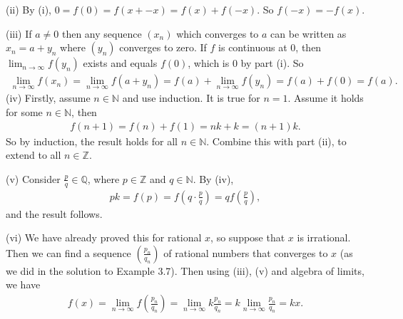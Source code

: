 \documentclass[letterpaper,10pt,english]{jupyterBook}
\begin{document}
\sphinxAtStartPar
(ii) By (i), \(0 = f(0) = f(x + -x) = f(x) + f(-x)\). So \(f(-x)=-f(x)\).

\sphinxAtStartPar
(iii) If \(a \neq 0\) then any sequence \((x_{n})\) which converges to \(a\) can be written as \(x_{n} = a + y_{n}\) where \((y_{n})\) converges to zero. If \(f\) is continuous at \(0\), then \( \lim_{n\rightarrow\infty} f(y_{n})\) exists and equals \(f(0)\), which is \(0\) by part (i). So
\begin{equation*}
\begin{split}
\lim_{n\rightarrow\infty} f(x_{n}) = \lim_{n\rightarrow\infty} f(a + y_{n}) = f(a) + \lim_{n\rightarrow\infty} f(y_{n}) = f(a) + f(0) = f(a).
\end{split}
\end{equation*}
\sphinxAtStartPar
(iv) Firstly, assume \(n\in\mathbb{N}\) and use induction. It is true for \(n = 1\). Assume it holds for some \(n\in\mathbb{N}\), then
\begin{equation*}
\begin{split}
f(n+1) = f(n) + f(1) = nk + k = (n+1)k.
\end{split}
\end{equation*}
\sphinxAtStartPar
So by induction, the result holds for all \(n\in\mathbb{N}\).
Combine this with part (ii), to extend to all \(n\in \mathbb{Z}\).

\sphinxAtStartPar
(v) Consider \(\frac{p}{q}\in\mathbb{Q}\), where \(p\in \mathbb{Z}\) and \(q\in \mathbb{N}\). By (iv),
\begin{equation*}
\begin{split}
pk = f(p) = f\left(q\cdot \frac{p}{q}\right) = qf\left(\frac{p}{q}\right),
\end{split}
\end{equation*}
\sphinxAtStartPar
and the result follows.

\sphinxAtStartPar
(vi) We have already proved this for rational \(x\), so suppose that \(x\) is irrational. Then we can find a sequence \(\left(\frac{p_{n}}{q_{n}}\right)\) of rational numbers that converges to \(x\) (as we did in the solution to Example 3.7). Then using (iii), (v) and algebra of limits, we have
\begin{equation*}
\begin{split}
f(x) = \lim_{n\rightarrow\infty} f\left(\frac{p_n}{q_n}\right) =   \lim_{n\rightarrow\infty} k \frac{p_n}{q_n}=k \lim_{n\rightarrow\infty} \frac{p_n}{q_n} = kx.
\end{split}
\end{equation*}
\end{document}
